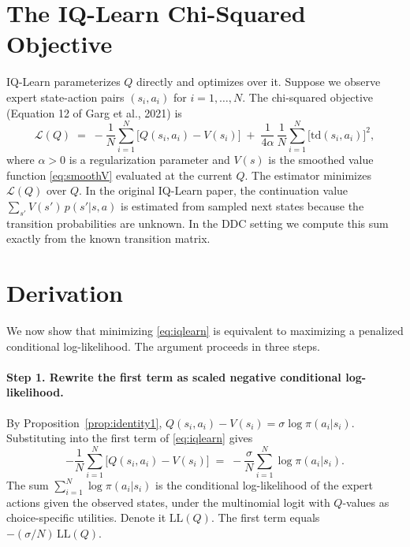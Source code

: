 \documentclass[11pt]{article}
\begin{document}
\section{The IQ-Learn Chi-Squared Objective}

IQ-Learn parameterizes $Q$ directly and optimizes over it. Suppose we observe expert state-action pairs $(s_i, a_i)$ for $i = 1, \ldots, N$. The chi-squared objective (Equation 12 of Garg et al., 2021) is
\begin{equation}
\mathcal{L}(Q) \;=\; -\frac{1}{N}\sum_{i=1}^{N}\bigl[Q(s_i,a_i) - V(s_i)\bigr] \;+\; \frac{1}{4\alpha}\,\frac{1}{N}\sum_{i=1}^{N}\bigl[\mathrm{td}(s_i,a_i)\bigr]^2,
\label{eq:iqlearn}
\end{equation}
where $\alpha > 0$ is a regularization parameter and $V(s)$ is the smoothed value function \eqref{eq:smoothV} evaluated at the current $Q$. The estimator minimizes $\mathcal{L}(Q)$ over $Q$. In the original IQ-Learn paper, the continuation value $\sum_{s'} V(s')\,p(s'|s,a)$ is estimated from sampled next states because the transition probabilities are unknown. In the DDC setting we compute this sum exactly from the known transition matrix.

\section{Derivation}

We now show that minimizing \eqref{eq:iqlearn} is equivalent to maximizing a penalized conditional log-likelihood. The argument proceeds in three steps.

\paragraph{Step 1. Rewrite the first term as scaled negative conditional log-likelihood.}

By Proposition~\ref{prop:identity1}, $Q(s_i,a_i) - V(s_i) = \sigma \log \pi(a_i|s_i)$. Substituting into the first term of \eqref{eq:iqlearn} gives
\begin{equation}
-\frac{1}{N}\sum_{i=1}^{N}\bigl[Q(s_i,a_i) - V(s_i)\bigr] \;=\; -\frac{\sigma}{N}\sum_{i=1}^{N} \log \pi(a_i|s_i).
\label{eq:step1}
\end{equation}
The sum $\sum_{i=1}^{N} \log \pi(a_i|s_i)$ is the conditional log-likelihood of the expert actions given the observed states, under the multinomial logit with $Q$-values as choice-specific utilities. Denote it $\mathrm{LL}(Q)$. The first term equals $-(\sigma/N)\,\mathrm{LL}(Q)$.
\end{document}
